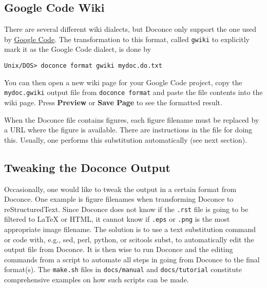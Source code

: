 \documentclass{article}
\begin{document}
\subsection{Google Code Wiki}

There are several different wiki dialects, but Doconce only support the
one used by \href{http://code.google.com/p/support/wiki/WikiSyntax}{Google Code}.
The transformation to this format, called {\fontsize{10pt}{10pt}\verb!gwiki!} to explicitly mark
it as the Google Code dialect, is done by
\vspace{4pt}
\begin{Verbatim}[numbers=none,frame=lines,label=\fbox{{\tiny Terminal}},fontsize=\fontsize{9pt}{9pt},
labelposition=topline,framesep=2.5mm,framerule=0.7pt]
Unix/DOS> doconce format gwiki mydoc.do.txt
\end{Verbatim}
You can then open a new wiki page for your Google Code project, copy
the {\fontsize{10pt}{10pt}\verb!mydoc.gwiki!} output file from {\fontsize{10pt}{10pt}\verb!doconce format!} and paste the
file contents into the wiki page. Press \textbf{Preview} or \textbf{Save Page} to
see the formatted result.

When the Doconce file contains figures, each figure filename must be
replaced by a URL where the figure is available. There are instructions
in the file for doing this. Usually, one performs this substitution
automatically (see next section).

\subsection{Tweaking the Doconce Output}

Occasionally, one would like to tweak the output in a certain format
from Doconce. One example is figure filenames when transforming
Doconce to reStructuredText. Since Doconce does not know if the
{\fontsize{10pt}{10pt}\verb!.rst!} file is going to be filtered to {\LaTeX} or HTML, it cannot know
if {\fontsize{10pt}{10pt}\verb!.eps!} or {\fontsize{10pt}{10pt}\verb!.png!} is the most appropriate image filename.
The solution is to use a text substitution command or code with, e.g., sed,
perl, python, or scitools subst, to automatically edit the output file
from Doconce. It is then wise to run Doconce and the editing commands
from a script to automate all steps in going from Doconce to the final
format(s). The {\fontsize{10pt}{10pt}\verb!make.sh!} files in {\fontsize{10pt}{10pt}\verb!docs/manual!} and {\fontsize{10pt}{10pt}\verb!docs/tutorial!} 
constitute comprehensive examples on how such scripts can be made.
\end{document}
